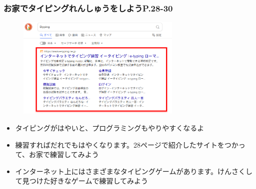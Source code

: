 \documentclass[dvipdfmx]{beamer}
\begin{document}
\begin{frame}[fragile]
	\frametitle{お家でタイピングれんしゅうをしようP.28-30~~~}
    \begin{figure}
      \centering
      \includegraphics[width=0.7\textwidth]{slide04_015.png}
    \end{figure}
      \begin{itemize}
        \item タイピングがはやいと、プログラミングもやりやすくなるよ
        \item 練習すればだれでもはやくなります。28ページで紹介したサイトをつかって、お家で練習してみよう
        \item インターネット上にはさまざまなタイピングゲームがあります。けんさくして見つけた好きなゲームで練習してみよう
      \end{itemize}
\end{frame}
\end{document}
